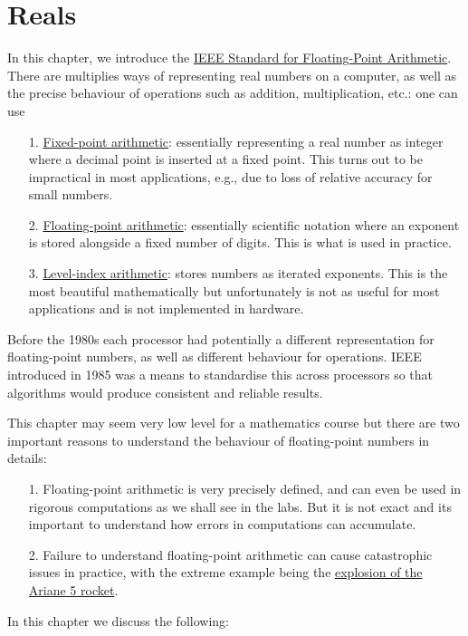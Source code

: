 
\section{Reals}
In this chapter, we introduce  the  \href{https://en.wikipedia.org/wiki/IEEE_754}{IEEE Standard for Floating-Point Arithmetic}. There are multiplies ways of representing real numbers on a computer, as well as  the precise behaviour of operations such as addition, multiplication, etc.: one can use

\begin{itemize}
\item[1. ] \href{https://en.wikipedia.org/wiki/Fixed-point_arithmetic}{Fixed-point arithmetic}: essentially representing a real number as integer where a decimal point is inserted at a fixed point. This turns out to be impractical in most applications, e.g., due to loss of relative accuracy for small numbers.


\item[2. ] \href{https://en.wikipedia.org/wiki/Floating-point_arithmetic}{Floating-point arithmetic}: essentially scientific notation where an exponent is stored alongside a fixed number of digits. This is what is used in practice.


\item[3. ] \href{https://en.wikipedia.org/wiki/Symmetric_level-index_arithmetic}{Level-index arithmetic}: stores numbers as iterated exponents. This is the most beautiful mathematically but unfortunately is not as useful for most applications and is not implemented in hardware.

\end{itemize}
Before the 1980s each processor had potentially a different representation for  floating-point numbers, as well as different behaviour for operations.  IEEE introduced in 1985 was a means to standardise this across processors so that algorithms would produce consistent and reliable results.

This chapter may seem very low level for a mathematics course but there are two important reasons to understand the behaviour of floating-point numbers in details:

\begin{itemize}
\item[1. ] Floating-point arithmetic is very precisely defined, and can even be used in rigorous computations as we shall see in the labs. But it is not exact and its important to understand how errors in computations can accumulate.


\item[2. ] Failure to understand floating-point arithmetic can cause catastrophic issues in practice, with the extreme example being the  \href{https://youtu.be/N6PWATvLQCY?t=86}{explosion of the Ariane 5 rocket}.

\end{itemize}
In this chapter we discuss the following:

